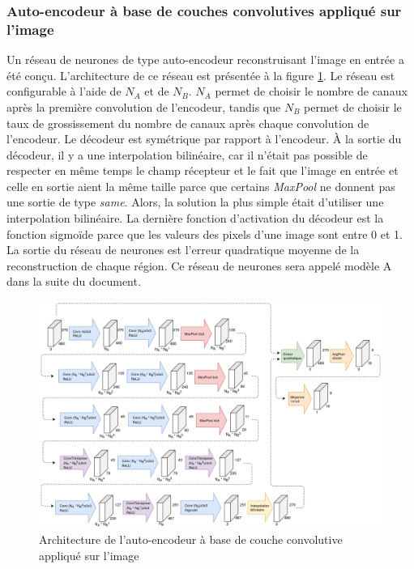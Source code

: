 \subsubsection{Auto-encodeur à base de couches convolutives appliqué sur l'image}
    Un réseau de neurones de type auto-encodeur reconstruisant l'image en entrée a été conçu. L'architecture de ce réseau est présentée à la figure \ref{fig:architecture_cnn_autoencoder}. Le réseau est configurable à l'aide de \(N_A\) et de \(N_B\). \(N_A\) permet de choisir le nombre de canaux après la première convolution de l'encodeur, tandis que \(N_B\) permet de choisir le taux de grossissement du nombre de canaux après chaque convolution de l'encodeur. Le décodeur est symétrique par rapport à l'encodeur. À la sortie du décodeur, il y a une interpolation bilinéaire, car il n'était pas possible de respecter en même temps le champ récepteur et le fait que l'image en entrée et celle en sortie aient la même taille parce que certains \textit{MaxPool} ne donnent pas une sortie de type \textit{same}. Alors, la solution la plus simple était d'utiliser une interpolation bilinéaire. La dernière fonction d'activation du décodeur est la fonction sigmoïde parce que les valeurs des pixels d'une image sont entre 0 et 1. La sortie du réseau de neurones est l'erreur quadratique moyenne de la reconstruction de chaque région. Ce réseau de neurones sera appelé modèle A dans la suite du document.
    \begin{figure}
        \centering
        \includegraphics[width=17cm]{images/Architecture_CnnAutoencoder.png}
        \caption{Architecture de l'auto-encodeur à base de couche convolutive appliqué sur l'image}
        \label{fig:architecture_cnn_autoencoder}
    \end{figure}

